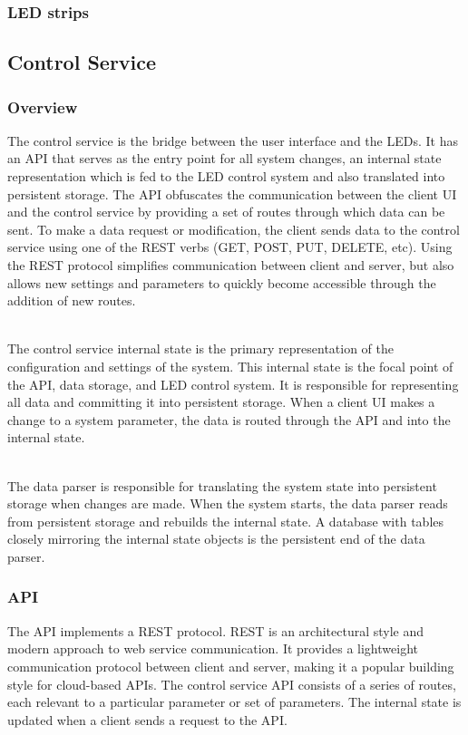 \documentclass[onecolumn, draftclsnofoot,10pt, compsoc]{IEEEtran}
\begin{document}
			\subsubsection{LED strips}


		\subsection{Control Service}
			\subsubsection{Overview}
			The control service is the bridge between the user interface and the LEDs.
			It has an API that serves as the entry point for all system changes, an internal state representation which is fed to the LED control system and also translated into persistent storage.
			The API obfuscates the communication between the client UI and the control service by providing a set of routes through which data can be sent.
			To make a data request or modification, the client sends data to the control service using one of the REST verbs (GET, POST, PUT, DELETE, etc).
			Using the REST protocol simplifies communication between client and server, but also allows new settings and parameters to quickly become accessible through the addition of new routes.

			\noindent \\The control service internal state is the primary representation of the configuration and settings of the system.
			This internal state is the focal point of the API, data storage, and LED control system.
			It is responsible for representing all data and committing it into persistent storage.
			When a client UI makes a change to a system parameter, the data is routed through the API and into the internal state.

			\noindent \\The data parser is responsible for translating the system state into persistent storage when changes are made.
			When the system starts, the data parser reads from persistent storage and rebuilds the internal state.
			A database with tables closely mirroring the internal state objects is the persistent end of the data parser.

			\subsubsection{API}
			The API implements a REST protocol. REST is an architectural style and modern approach to web service communication. \cite{rest1}
			It provides a lightweight communication protocol between client and server, making it a popular building style for cloud-based APIs.
			The control service API consists of a series of routes, each relevant to a particular parameter or set of parameters.
			The internal state is updated when a client sends a request to the API.
\end{document}
